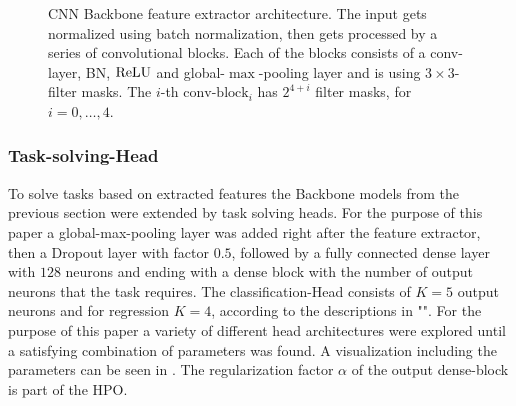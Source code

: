 \begin{figure}[!ht]
    \centering

    \caption{CNN Backbone feature extractor architecture. The input gets normalized using batch normalization, then gets processed by a series of convolutional blocks. Each of the blocks consists of a conv-layer\footnotemark, BN, $\operatorname{ReLU}$ and global-$\max$-pooling layer and is using $3\times 3$-filter masks. The $i$-th  $\text{conv-block}_i$ has $2^{4+i}$ filter masks, for $i=0,\ldots,4$.}
    \label{fig:inet}
\end{figure}
\subsubsection{Task-solving-Head}\label{subsubsec:task-solving-head}
To solve tasks based on extracted features the Backbone models from the previous section were extended by task solving heads.
For the purpose of this paper a global-max-pooling layer was added right after the feature extractor, then a Dropout layer with factor $0.5$, followed by a fully connected dense layer with $128$ neurons and ending with a dense block with the number of output neurons that the task requires.
The classification-Head consists of $K=5$ output neurons and for regression $K=4$, according to the descriptions in "".
For the purpose of this paper a variety of different head architectures were explored until a satisfying combination of parameters was found.
A visualization including the parameters can be seen in .
The regularization factor $\alpha$ of the output dense-block is part of the HPO.

